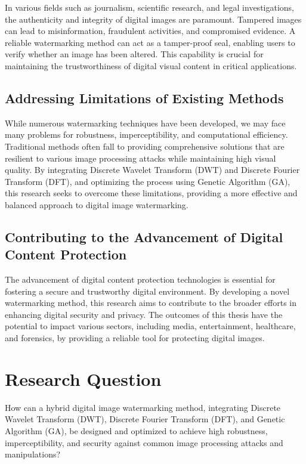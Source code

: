 In various fields such as journalism, scientific research, and legal investigations, the authenticity and integrity of digital images are paramount. Tampered images can lead to misinformation, fraudulent activities, and compromised evidence. A reliable watermarking method can act as a tamper-proof seal, enabling users to verify whether an image has been altered. This capability is crucial for maintaining the trustworthiness of digital visual content in critical applications.

\subsection{Addressing Limitations of Existing Methods}

While numerous watermarking techniques have been developed, we may face many problems for robustness, imperceptibility, and computational efficiency. Traditional methods often fall to providing comprehensive solutions that are resilient to various image processing attacks while maintaining high visual quality. By integrating Discrete Wavelet Transform (DWT) and Discrete Fourier Transform (DFT), and optimizing the process using Genetic Algorithm (GA), this research seeks to overcome these limitations, providing a more effective and balanced approach to digital image watermarking.

\subsection{Contributing to the Advancement of Digital Content Protection}

The advancement of digital content protection technologies is essential for fostering a secure and trustworthy digital environment. By developing a novel watermarking method, this research aims to contribute to the broader efforts in enhancing digital security and privacy. The outcomes of this thesis have the potential to impact various sectors, including media, entertainment, healthcare, and forensics, by providing a reliable tool for protecting digital images.

\section{Research Question}

How can a hybrid digital image watermarking method, integrating Discrete Wavelet Transform (DWT), Discrete Fourier Transform (DFT), and Genetic Algorithm (GA), be designed and optimized to achieve high robustness, imperceptibility, and security against common image processing attacks and manipulations?

